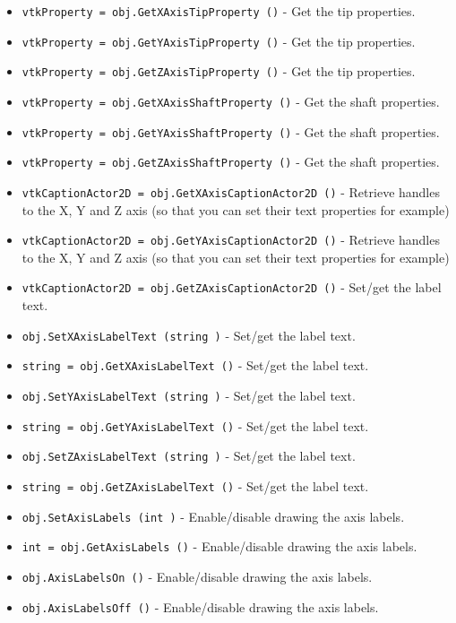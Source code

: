 \begin{itemize}
\item  \verb|vtkProperty = obj.GetXAxisTipProperty ()| -  Get the tip properties.

\item  \verb|vtkProperty = obj.GetYAxisTipProperty ()| -  Get the tip properties.

\item  \verb|vtkProperty = obj.GetZAxisTipProperty ()| -  Get the tip properties.

\item  \verb|vtkProperty = obj.GetXAxisShaftProperty ()| -  Get the shaft properties.

\item  \verb|vtkProperty = obj.GetYAxisShaftProperty ()| -  Get the shaft properties.

\item  \verb|vtkProperty = obj.GetZAxisShaftProperty ()| -  Get the shaft properties.

\item  \verb|vtkCaptionActor2D = obj.GetXAxisCaptionActor2D ()| -  Retrieve handles to the X, Y and Z axis (so that you can set their text
 properties for example)

\item  \verb|vtkCaptionActor2D = obj.GetYAxisCaptionActor2D ()| -  Retrieve handles to the X, Y and Z axis (so that you can set their text
 properties for example)

\item  \verb|vtkCaptionActor2D = obj.GetZAxisCaptionActor2D ()| -  Set/get the label text.

\item  \verb|obj.SetXAxisLabelText (string )| -  Set/get the label text.

\item  \verb|string = obj.GetXAxisLabelText ()| -  Set/get the label text.

\item  \verb|obj.SetYAxisLabelText (string )| -  Set/get the label text.

\item  \verb|string = obj.GetYAxisLabelText ()| -  Set/get the label text.

\item  \verb|obj.SetZAxisLabelText (string )| -  Set/get the label text.

\item  \verb|string = obj.GetZAxisLabelText ()| -  Set/get the label text.

\item  \verb|obj.SetAxisLabels (int )| -  Enable/disable drawing the axis labels.

\item  \verb|int = obj.GetAxisLabels ()| -  Enable/disable drawing the axis labels.

\item  \verb|obj.AxisLabelsOn ()| -  Enable/disable drawing the axis labels.

\item  \verb|obj.AxisLabelsOff ()| -  Enable/disable drawing the axis labels.

\end{itemize}

